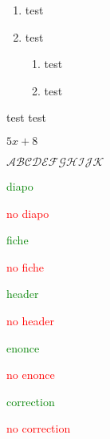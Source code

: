 \documentclass{classe-tex3R-2-1}
\begin{document}

\titreactif








\begin{enumerate}
  \item test
  \item test
  \begin{enumerate}
    \item test
    \item test
  \end{enumerate}
\end{enumerate}


\begin{tasks}[style=enumerate]
  \task test
  \task test
\end{tasks}


$5x+8 $

$\mathcal{ABCDEFGHIJK}$



\begin{scratch}
\end{scratch}




\ifdiapo \textcolor{green}{diapo}\par \else \hfill \textcolor{red}{no} \textcolor{red}{diapo}\par \fi
\iffiche \textcolor{green}{fiche}\par \else \hfill \textcolor{red}{no} \textcolor{red}{fiche}\par \fi
\ifheader \textcolor{green}{header}\par \else \hfill \textcolor{red}{no} \textcolor{red}{header}\par \fi


\ifenonce \textcolor{green}{enonce}\par \else \hfill \textcolor{red}{no} \textcolor{red}{enonce}\par \fi
\ifcorrection \textcolor{green}{correction}\par \else \hfill \textcolor{red}{no} \textcolor{red}{correction}\par \fi
\end{document}
